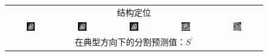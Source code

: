 \begin{figure}
\begin{center}
\begin{tabular}{ccccc}
\multicolumn{5}{c}{结构定位} \\

\includegraphics[width=0.19\textwidth]{./data/representative-results/overt/HCMNet_1100083/00_SAX/BASE/0_bbox.png} &
\includegraphics[width=0.19\textwidth]{./data/representative-results/overt/HCMNet_1100083/00_SAX/MID/0_bbox.png} &
\includegraphics[width=0.19\textwidth]{./data/representative-results/overt/HCMNet_1100083/00_SAX/APEX/0_bbox.png} &
\includegraphics[width=0.19\textwidth]{./data/representative-results/overt/HCMNet_1100367/01_HLA/00/0_bbox.png} &
\includegraphics[width=0.19\textwidth]{./data/representative-results/overt/HCMNet_1100027/02_VLA/00/0_bbox.png} \\

\multicolumn{5}{c}{在典型方向下的分割预测值：$S^\prime$} \\


\end{tabular}
\end{center}
\end{figure}
